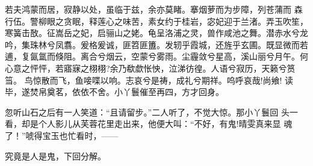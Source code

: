 若夫鸿蒙而居，寂静以处，虽临于兹，余亦莫睹。搴烟萝而为步障，列苍蒲而
森行伍。警柳眼之贪眠，释莲心之味苦，素女约于桂岩，宓妃迎于兰渚。弄玉吹笙，
寒簧击敔。征嵩岳之妃，启骊山之姥。龟呈洛浦之灵，兽作咸池之舞。潜赤水兮龙
吟，集珠林兮凤翥。爰格爰诚，匪笤匪簠。发轫乎霞城，还旌乎玄圃。既显微而若
逋，复氤氲而倏阻。离合兮烟云，空蒙兮雾雨。尘霾敛兮星高，溪山丽兮月午。何
心意之怦怦，若寤寐之栩栩?余乃欷歔怅怏，泣涕彷徨。人语兮寂历，天籁兮筼筜。
鸟惊散而飞，鱼唼喋以响。志哀兮是祷，成礼兮期祥。呜呼哀哉!尚飨!
读毕，遂焚帛奠茗，依依不舍。小丫鬟催至再四，方才回身。

忽听山石之后有一人笑道：“且请留步。”二人听了，不觉大惊。那小丫鬟回
头一看，却是个人影儿从芙蓉花里走出来，他便大叫：“不好，有鬼!晴雯真来显
魂了！”唬得宝玉也忙看时，——

究竟是人是鬼，下回分解。